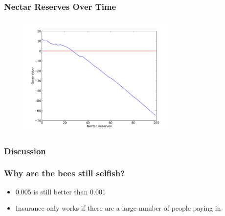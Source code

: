 \documentclass{beamer}
\begin{document}
        \begin{frame}[t]\frametitle{Nectar Reserves Over Time}
          \begin{figure}
          \includegraphics[width=8cm]{results/hive_influenced_bees_nectar.png}
          \end{figure}
        \end{frame}




      \subsubsection{Discussion} %
      \label{ssub:discussion}

        \begin{frame}[c]\frametitle{Why are the bees still selfish?}

          \begin{itemize}
            \item 0.005 is still better than 0.001
            \item Insurance only works if there are a large number of people
                  paying in
          \end{itemize}
        
        \end{frame}
\end{document}
